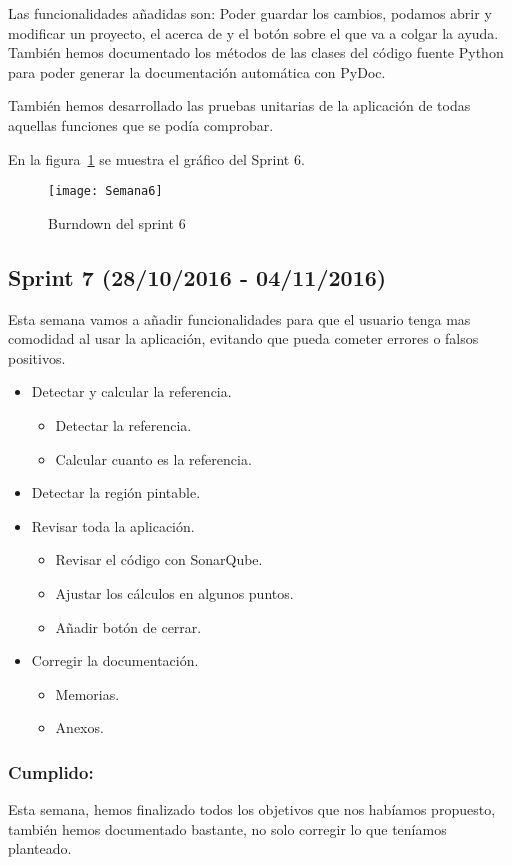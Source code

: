 Las funcionalidades añadidas son:
Poder guardar los cambios, podamos abrir y modificar un proyecto, el acerca de y el botón sobre el que va a colgar la ayuda.
También hemos documentado los métodos de las clases del código fuente Python para poder generar la documentación automática con PyDoc.

También hemos desarrollado las pruebas unitarias de la aplicación de todas aquellas funciones que se podía comprobar. 


En la figura~\ref{fig:A.2.6} se muestra el gráfico del Sprint 6.

\begin{figure}[h]
\centering
\texttt{[image: Semana6]}
\caption{Burndown del sprint 6}
\label{fig:A.2.6}
\end{figure}

\subsection{Sprint 7 (28/10/2016 - 04/11/2016)}

Esta semana vamos a añadir funcionalidades para que el usuario tenga mas comodidad al usar la aplicación, evitando que pueda cometer errores o falsos positivos.


\begin{itemize}
	\item Detectar y calcular la referencia.
		\begin{itemize}
			\item Detectar la referencia.
			\item Calcular cuanto es la referencia.
		\end{itemize}
	\item Detectar la región pintable.
	\item Revisar toda la aplicación.
		\begin{itemize}
			\item Revisar el código con SonarQube.
			\item Ajustar los cálculos en algunos puntos.
			\item Añadir botón de cerrar.
		\end{itemize}
	\item Corregir la documentación.
		\begin{itemize}
			\item Memorias.
			\item Anexos.
		\end{itemize}			
\end{itemize}
\subsubsection{Cumplido:}
Esta semana, hemos finalizado todos los objetivos que nos habíamos propuesto, también hemos documentado bastante, no solo corregir lo que teníamos planteado.

